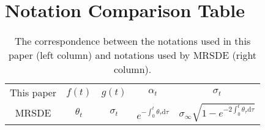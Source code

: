 \section{Notation Comparison Table}
\label{appb}


\renewcommand{\arraystretch}{1.5}
\begin{table}[ht]
\label{table2}
\begin{center}

\begin{tabular}{ccccc}
\toprule[1pt]
This paper & $f(t)$ & $g(t)$ & $\alpha_t$ & $\sigma_t$ \\
\cmidrule(lr){1-5}
MRSDE \citep{luo2023mrsde} & $\theta_t$ & $\sigma_t$ & $e^{-\int_0^t\theta_\tau\mathrm{d}\tau}$ & $\sigma_\infty\sqrt{1-e^{-2\int_0^t\theta_\tau\mathrm{d}\tau}}$\\
\bottomrule[1pt]
\end{tabular}
\end{center}
\caption{The correspondence between the notations used in this paper (left column) and notations used by MRSDE (right column).}
\end{table}
